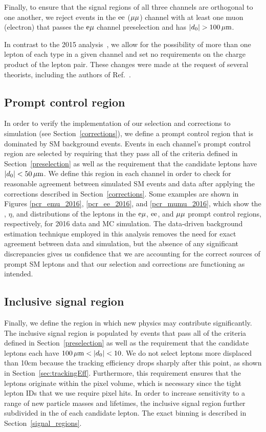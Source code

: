 Finally, to ensure that the signal regions of all three channels are orthogonal to one another, we reject events in the $\mathrm{e}\mathrm{e}$ (${\mu}{\mu}$) channel with at least one muon (electron) that passes the $\mathrm{e}{\mu}$ channel preselection and has $\lvert d_0 \rvert>100\,\mu\text{m}$.

In contrast to the 2015 analysis~\cite{CMS:DisplacedEMu}, we allow for the possibility of more than one lepton of each type in a given channel and set no requirements on the charge product of the lepton pair. These changes were made at the request of several theorists, including the authors of Ref.~\cite{Evans:2016zau}.

\subsection{Prompt control region}
\label{pcr}
In order to verify the implementation of our selection and corrections to simulation (see Section~\ref{corrections}), we define a prompt control region that is dominated by SM background events. Events in each channel's prompt control region are selected by requiring that they pass all of the criteria defined in Section~\ref{preselection} as well as the requirement that the candidate leptons have $\lvert d_0 \rvert<50\,\mu\text{m}$. We define this region in each channel in order to check for reasonable agreement between simulated SM events and data after applying the corrections described in Section~\ref{corrections}. Some examples are shown in Figures \ref{pcr_emu_2016}, \ref{pcr_ee_2016}, and \ref{pcr_mumu_2016}, which show the \pt, $\eta$, and \ad distributions of the leptons in the $\mathrm{e}{\mu}$, $\mathrm{e}\mathrm{e}$, and ${\mu}{\mu}$ prompt control regions, respectively, for 2016 data and MC simulation. The data-driven background estimation technique employed in this analysis removes the need for exact agreement between data and simulation, but the absence of any significant discrepancies gives us confidence that we are accounting for the correct sources of prompt SM leptons and that our selection and corrections are functioning as intended.





\subsection{Inclusive signal region}
Finally, we define the region in which new physics may contribute significantly. The inclusive signal region is populated by events that pass all of the criteria defined in Section~\ref{preselection} as well as the requirement that the candidate leptons each have $100\mum<\ad<10\unit{cm}$. We do not select leptons more displaced than 10\unit{cm} because the tracking efficiency drops sharply after this point, as shown in Section~\ref{sec:trackingEff}. Furthermore, this requirement ensures that the leptons originate within the pixel volume, which is necessary since the tight lepton IDs that we use require pixel hits. In order to increase sensitivity to a range of new particle masses and lifetimes, the inclusive signal region further subdivided in the \ad of each candidate lepton. The exact binning is described in Section~\ref{signal_regions}.


\pagebreak